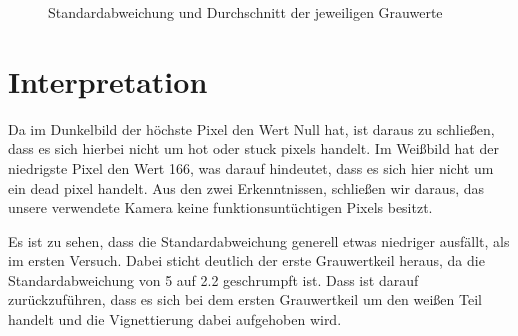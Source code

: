 \documentclass[12pt, oneside, a4paper, \docLanguage]{report}
\begin{document}
\begin{figure}[hbt!]
      \centering
      \hfill
      \caption{Standardabweichung und Durchschnitt der jeweiligen Grauwerte}
      \label{fig:VERSUCH_4_AUSWERTUNG_BERECHNUNG}
\end{figure}

\section{Interpretation}
\label{chap:VERSUCH_4_INTERPRETATION}
Da im Dunkelbild der höchste Pixel den Wert Null hat, ist daraus zu schließen, dass es sich hierbei nicht um hot oder stuck pixels handelt. Im Weißbild hat der niedrigste Pixel den Wert 166, was darauf hindeutet, dass es sich hier nicht um ein dead pixel handelt. Aus den zwei Erkenntnissen, schließen wir daraus, das unsere verwendete Kamera keine funktionsuntüchtigen Pixels besitzt.

Es ist zu sehen, dass die Standardabweichung generell etwas niedriger ausfällt, als im ersten Versuch. Dabei sticht deutlich der erste Grauwertkeil heraus, da die Standardabweichung von 5 auf 2.2 geschrumpft ist. Dass ist darauf zurückzuführen, dass es sich bei dem ersten Grauwertkeil um den weißen Teil handelt und die Vignettierung dabei aufgehoben wird.

%
%
\renewcommand\thesection{A.\arabic{section}}
\renewcommand\thesubsection{\thesection.\arabic{subsection}}
\end{document}

